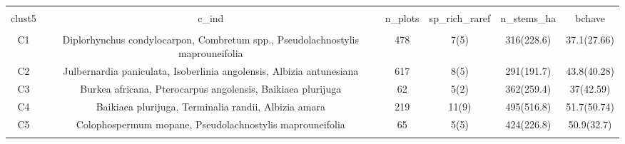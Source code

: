 
\begin{table}[!htbp] \centering 
  \caption{} 
  \label{clust_summ} 
\begin{tabular}{@{\extracolsep{5pt}} cccccc} 
\\[-1.8ex]\hline 
\hline \\[-1.8ex] 
clust5 & c\_ind & n\_plots & sp\_rich\_raref & n\_stems\_ha & bchave \\ 
\hline \\[-1.8ex] 
C1 & Diplorhynchus condylocarpon, Combretum spp., Pseudolachnostylis maprouneifolia & 478 & 7(5) & 316(228.6) & 37.1(27.66) \\ 
C2 & Julbernardia paniculata, Isoberlinia angolensis, Albizia antunesiana & 617 & 8(5) & 291(191.7) & 43.8(40.28) \\ 
C3 & Burkea africana, Pterocarpus angolensis, Baikiaea plurijuga & 62 & 5(2) & 362(259.4) & 37(42.59) \\ 
C4 & Baikiaea plurijuga, Terminalia randii, Albizia amara & 219 & 11(9) & 495(516.8) & 51.7(50.74) \\ 
C5 & Colophospermum mopane, Pseudolachnostylis maprouneifolia & 65 & 5(5) & 424(226.8) & 50.9(32.7) \\ 
\hline \\[-1.8ex] 
\end{tabular} 
\end{table} 
